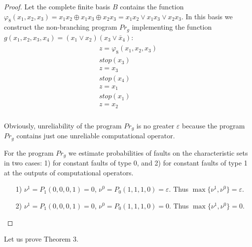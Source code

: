 \documentclass[
11pt,%
tightenlines,%
twoside,%
onecolumn,%
nofloats,%
nobibnotes,%
nofootinbib,%
superscriptaddress,%
noshowpacs,%
centertags]%
{revtex4}
\begin{document}
\begin{proof}
Let the complete finite basis $B$ contains the function
$\varphi_8(x_1, x_2, x_3)=x_1 x_2\oplus x_1 x_3 \oplus x_2 x_3
=x_1x_2\vee x_1x_3\vee x_2x_3$. In this basis we construct the
non-branching program $Pr_g$ implementing the function $g(x_1, x_2,
x_3, x_4)= (x_1\vee x_2) (x_3 \vee \bar{x}_4)$:
\begin{eqnarray*}
\begin{array}{l}
  z=\varphi_8(x_1, x_2, x_3)\\
  stop(x_3)\\
  z=x_3\\
  stop(x_4)\\
  z=x_1\\
  stop(x_1)\\
  z=x_2 \\
\end{array}
\end{eqnarray*}

Obviously, unreliability of the program $Pr_g$ is no greater
$\varepsilon$ because the program $Pr_g$ contains just one
unreliable computational operator.

For the program $Pr_g$ we estimate probabilities of faults on  the
characteristic sets in two cases: 1) for constant faults of type 0,
and 2) for constant faults of type 1 at the outputs of computational
operators.
\begin{itemize}
\item[1)] $\nu^1=P_1(0, 0, 0, 1)=0$,  $\nu^0=P_0(1, 1, 1, 0)=\varepsilon$. Thus $\max\{\nu^1, \nu^0\}=\varepsilon$.
\item[2)] $\nu^1=P_1(0, 0, 0, 1)=0$,  $\nu^0=P_0(1, 1, 1, 0)=0$. Thus $\max\{\nu^1, \nu^0\}=0$.
\end{itemize}
\end{proof}

Let us prove Theorem 3.
\end{document}
